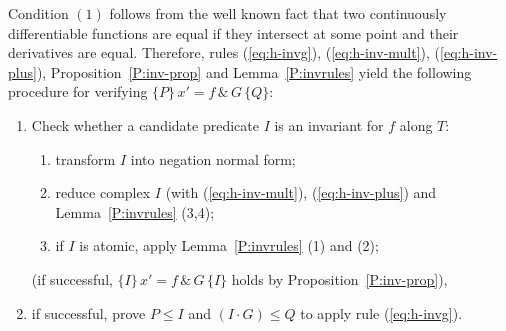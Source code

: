 \documentclass[envcountsame,envcountsect]{llncs}
\begin{document}
Condition $(1)$ follows from the well known fact that two continuously
differentiable functions are equal if they intersect at some point and
their derivatives are equal. Therefore, rules (\ref{eq:h-invg}),
(\ref{eq:h-inv-mult}), (\ref{eq:h-inv-plus}),
Proposition~\ref{P:inv-prop} and Lemma~\ref{P:invrules} yield the
following procedure for verifying $\{P\}\, x' = f\, \&\, G\, \{Q\}$:
\begin{enumerate}
\item Check whether a candidate predicate $I$ is an invariant for $f$
  along $T$:
	\begin{enumerate}
	\item transform $I$ into negation normal form;
	\item reduce complex $I$ (with (\ref{eq:h-inv-mult}), (\ref{eq:h-inv-plus}) and Lemma~\ref{P:invrules} (3,4);
	\item if $I$ is atomic, apply Lemma~\ref{P:invrules} (1) and (2);
	\end{enumerate}
(if successful,  $\{I\}\, x' = f\, \&\, G\, \{I\}$ holds by Proposition~\ref{P:inv-prop}),
\item if successful, prove $P\le I$ and $(I\cdot G)\le Q$ to apply rule (\ref{eq:h-invg}).
\end{enumerate}
\end{document}
